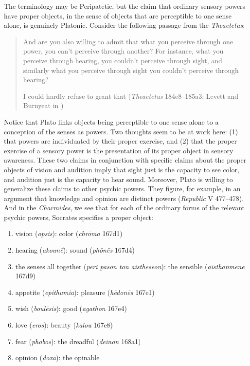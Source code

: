 The terminology may be Peripatetic, but the claim that ordinary sensory powers have proper objects, in the sense of objects that are perceptible to one sense alone, is genuinely Platonic. Consider the following passage from the \emph{Theaetetus}:
\begin{quotation}
	And are you also willing to admit that what you perceive through one power, you can't perceive through another? For instance, what you perceive through hearing, you couldn't perceive through sight, and similarly what you perceive through sight you couldn't perceive through hearing?
	
	I could hardly refuse to grant that (\emph{Theaetetus} 184e8–185a3; Levett and Burnyeat in \citealt[204]{Cooper:1997fk})
\end{quotation}
Notice that Plato links objects being perceptible to one sense alone to a conception of the senses as powers. Two thoughts seem to be at work here: (1) that powers are individuated by their proper exercise, and (2) that the proper exercise of a sensory power is the presentation of its proper object in sensory awareness. These two claims in conjunction with specific claims about the proper objects of vision and audition imply that sight just is the capacity to see color, and audition just is the capacity to hear sound. Moreover, Plato is willing to generalize these claims to other psychic powers. They figure, for example, in an argument that knowledge and opinion are distinct powers (\emph{Republic} V 477--478). And in the \emph{Charmides}, we see that for each of the ordinary forms of the relevant psychic powers, Socrates specifies a proper object:
\begin{enumerate}[(1)]
	\item vision (\emph{opsis}): color (\emph{chrōma} 167d1)
	\item hearing (\emph{akounē}): sound (\emph{phōnēs} 167d4)
	\item the senses all together (\emph{peri pasōn tōn aisthēseon}): the sensible (\emph{aisthanmenē} 167d9)
	\item appetite (\emph{epithumia}): pleasure (\emph{hēdonēs} 167e1)
	\item wish (\emph{boulēsis}): good (\emph{agathon} 167e4)
	\item love (\emph{eros}): beauty (\emph{kalou} 167e8)
	\item fear (\emph{phobos}): the dreadful (\emph{deinōn} 168a1)
	\item opinion (\emph{doxa}): the opinable
\end{enumerate}

